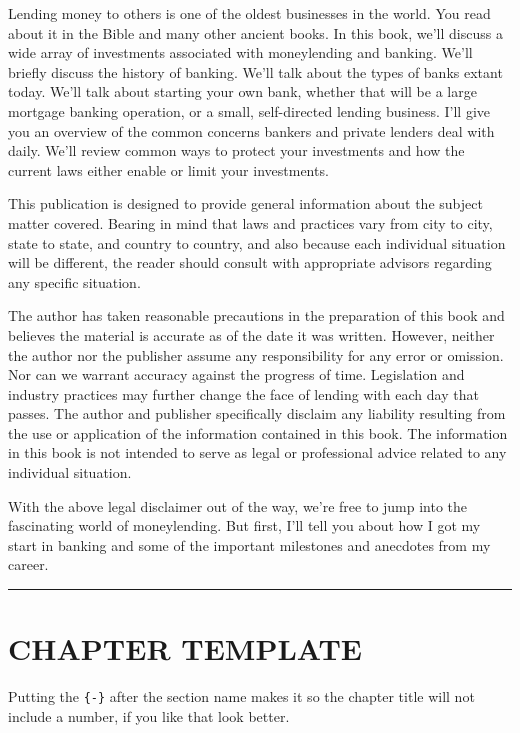 \documentclass[
]{book}
\begin{document}
Lending money to others is one of the oldest businesses in the world. You read about it in the Bible and many other ancient books. In this book, we'll discuss a wide array of investments associated with moneylending and banking. We'll briefly discuss the history of banking. We'll talk about the types of banks extant today. We'll talk about starting your own bank, whether that will be a large mortgage banking operation, or a small, self-directed lending business. I'll give you an overview of the common concerns bankers and private lenders deal with daily. We'll review common ways to protect your investments and how the current laws either enable or limit your investments.

This publication is designed to provide general information about the subject matter covered. Bearing in mind that laws and practices vary from city to city, state to state, and country to country, and also because each individual situation will be different, the reader should consult with appropriate advisors regarding any specific situation.

The author has taken reasonable precautions in the preparation of this book and believes the material is accurate as of the date it was written. However, neither the author nor the publisher assume any responsibility for any error or omission. Nor can we warrant accuracy against the progress of time. Legislation and industry practices may further change the face of lending with each day that passes. The author and publisher specifically disclaim any liability resulting from the use or application of the information contained in this book. The information in this book is not intended to serve as legal or professional advice related to any individual situation.

With the above legal disclaimer out of the way, we're free to jump into the fascinating world of moneylending. But first, I'll tell you about how I got my start in banking and some of the important milestones and anecdotes from my career.

\begin{center}\rule{0.5\linewidth}{0.5pt}\end{center}

\hypertarget{chapter-template}{%
\chapter*{CHAPTER TEMPLATE}\label{chapter-template}}


Putting the \texttt{\{-\}} after the section name makes it so the chapter title will not include a number, if you like that look better.
\end{document}
